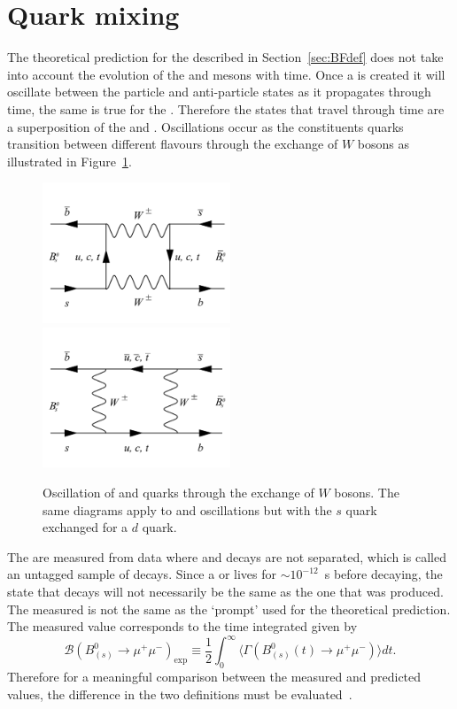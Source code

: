 {\section{Quark mixing}
\label{sec:quarkmaixing}
The theoretical prediction for the \bmumu \BFs described in Section~\ref{sec:BFdef} does not take into account the evolution of the \bsd and \barbsd mesons with time. Once a \bsd is created it will oscillate between the particle and anti-particle states as it propagates through time, the same is true for the \barbsd. Therefore the states that travel through time are a superposition of the \bsd and \barbsd. Oscillations occur as the constituents quarks transition between different flavours through the exchange of $W$ bosons as illustrated in Figure~\ref{fig:Oscl_diag}.
\begin{figure}[tbp]
    \centering
        \includegraphics[width=0.5\textwidth]{./Figs/Theory/Oscillation_1.pdf}
        \includegraphics[width=0.5\textwidth]{./Figs/Theory/Oscillation_2.pdf}
    \caption{Oscillation of \bs and \barbs quarks through the exchange of $W$ bosons. The same diagrams apply to \bd and \barbd oscillations but with the $s$ quark exchanged for a $d$ quark.}
    \label{fig:Oscl_diag}
\end{figure}
The \BFs are measured from data where \bsd and \barbsd decays are not separated, which is called an untagged sample of \bmumu decays. Since a \bsd or \barbsd lives for $\sim10^{-12}$~s before decaying, the state that decays will not necessarily be the same as the one that was produced. The measured \BF is not the same as the `prompt' \BF used for the theoretical prediction. The measured value corresponds to the time integrated \BF given by~\cite{DeBruyn:2012wj}
\begin{equation}
  \mathcal{B}(B^0_{(s)} \to \mu^+ \mu^-)_{\mathrm{exp}} \equiv \frac{1}{2} \int^{\infty}_0 \langle \Gamma(B^0_{(s)}(t) \to \mu^+\mu^-) \rangle dt.
\label{eq:time_BF}
\end{equation}
Therefore for a meaningful comparison between the measured and predicted \BF values, the difference in the two definitions must be evaluated~\cite{DeBruyn:2012wj,DeBruyn:2012wk,Buras:2013uqa}. %

}
